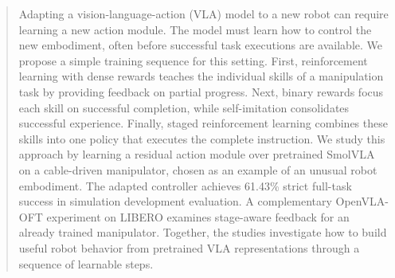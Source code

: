\begin{abstract}
Adapting a vision-language-action (VLA) model to a new robot can require learning a new action module. The model must learn how to control the new embodiment, often before successful task executions are available. We propose a simple training sequence for this setting. First, reinforcement learning with dense rewards teaches the individual skills of a manipulation task by providing feedback on partial progress. Next, binary rewards focus each skill on successful completion, while self-imitation consolidates successful experience. Finally, staged reinforcement learning combines these skills into one policy that executes the complete instruction. We study this approach by learning a residual action module over pretrained SmolVLA on a cable-driven manipulator, chosen as an example of an unusual robot embodiment. The adapted controller achieves 61.43\% strict full-task success in simulation development evaluation. A complementary OpenVLA-OFT experiment on LIBERO examines stage-aware feedback for an already trained manipulator.  Together, the studies investigate how to build useful robot behavior from pretrained VLA representations through a sequence of learnable steps.
\end{abstract}
